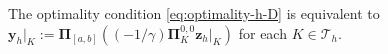 \documentclass[smallextended]{svjour3}
\numberwithin{equation}{section}
\numberwithin{figure}{section}
\numberwithin{table}{section}
\newcommand\bV{\mathbf{V}}
\newcommand\bPi{\boldsymbol{\Pi}}
\newcommand\ff{\boldsymbol{f}}
\newcommand\bx{\boldsymbol{x}}
\newcommand\by{\boldsymbol{y}}
\newcommand\bu{\boldsymbol{u}}
\newcommand\bv{\boldsymbol{v}}
\newcommand\bz{\boldsymbol{z}}
\newcommand\cT{\mathcal{T}}
\begin{document}
	
	\noindent The optimality condition \eqref{eq:optimality-h-D} is equivalent to $\by_h|_K:= \bPi_{[a,b]} \left((-1/\gamma) \bPi^{0,0}_K \bz_h|_K  \right)$ for each $K \in \cT_h$.
	
\end{document}
